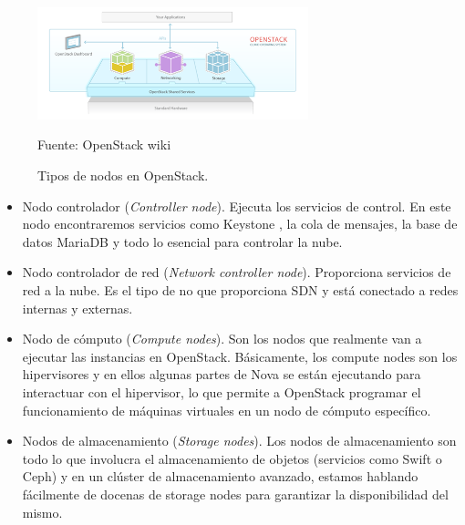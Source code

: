\begin{figure}
    \centering
    \includegraphics[width=0.7\textwidth]{imagenes/capitulo6/nodos.png}
    \caption{Tipos de nodos en OpenStack.}
	\vspace{0.3cm}
    \footnotesize{Fuente: OpenStack wiki}
    \label{nodos}
\end{figure}

\begin{itemize}
\item Nodo controlador (\textit{Controller node}). Ejecuta los servicios de control. En este nodo encontraremos servicios como Keystone , la cola de mensajes, la base de datos MariaDB y todo lo esencial para controlar la nube.
\end{itemize}

\begin{itemize}
\item Nodo controlador de red (\textit{Network controller node}).  Proporciona servicios de red a la nube. Es el tipo de no que proporciona SDN y está conectado a redes internas y externas.
\end{itemize}

\begin{itemize}
\item Nodo de cómputo (\textit{Compute nodes}). Son los nodos que realmente van a ejecutar las instancias en OpenStack. Básicamente, los compute nodes son los hipervisores y en ellos algunas partes de Nova se están ejecutando para interactuar con el hipervisor, lo que permite a OpenStack programar el funcionamiento de máquinas virtuales en un nodo de cómputo específico.
\end{itemize}

\begin{itemize}
\item Nodos de almacenamiento (\textit{Storage nodes}). Los nodos de almacenamiento son todo lo que involucra  el almacenamiento de objetos (servicios como Swift o Ceph) y en un clúster de almacenamiento avanzado, estamos hablando fácilmente de docenas de storage nodes para garantizar la disponibilidad del mismo.
\end{itemize}

